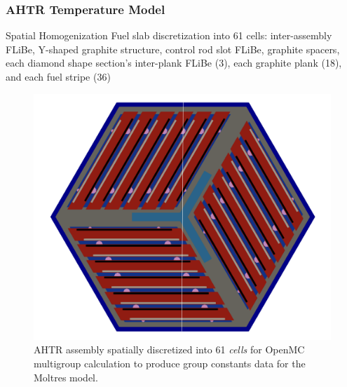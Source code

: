 \begin{frame}
    \frametitle{AHTR Temperature Model}
    \begin{block}{Spatial Homogenization}
        Fuel slab discretization into 61 cells: inter-assembly FLiBe, Y-shaped graphite 
        structure, control rod slot FLiBe, graphite spacers, each diamond shape 
        section's inter-plank FLiBe (3), each graphite plank (18), and each
        fuel stripe (36)
    \end{block}
    \begin{figure}[]
        \begin{minipage}[c]{0.7\textwidth}
            \centering
            \includegraphics[width=\linewidth]{../docs/figures/assembly_mg.png}
        \end{minipage}\hfill
        \begin{minipage}[c]{0.3\textwidth}
        \caption{\acrfull{AHTR} assembly spatially discretized into 61 \textit{cells} 
        for OpenMC multigroup calculation to produce group constants data for the 
        Moltres model.}
    \end{minipage}
    \end{figure}

\end{frame}